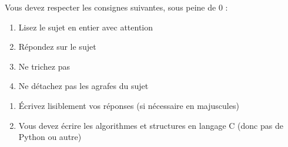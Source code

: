 \documentclass[11pt,a4paper]{article}
\begin{document}
\MakeExamTitle                   %


\bigskip

Vous devez respecter les consignes suivantes, sous peine de 0 :

\begin{table}[ht!]
  \begin{minipage}{0.45\textwidth}

\begin{enumerate}[label=\Roman*)]
\item Lisez le sujet en entier avec attention
\item Répondez sur le sujet
\item Ne trichez pas
\item Ne détachez pas les agrafes du sujet
\end{enumerate}

  \end{minipage}
  \hfillx
  \begin{minipage}{0.55\textwidth}

\begin{enumerate}[label=\Roman*),start=5]
\item \'Ecrivez lisiblement vos réponses (si nécessaire en majuscules)
\item Vous devez écrire les algorithmes et structures en langage C (donc pas de Python ou autre)
\end{enumerate}

  \end{minipage}
\end{table}

\end{document}
